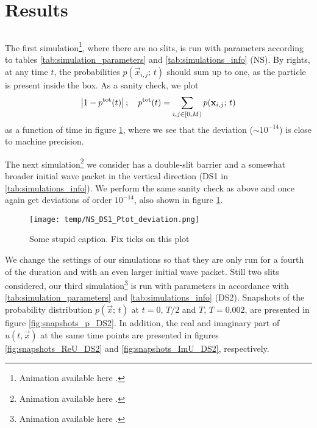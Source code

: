 \section{Results}\label{sec:results}




\subsection{}

    The first simulation\footnote{Animation available here .}, where there are no slits, is run with parameters according to tables \ref{tab:simulation_parameters} and \ref{tab:simulations_info} (NS). By rights, at any time $t$, the probabilities $p(\vec{x}_{i,j}; \, t)$ should sum up to one, as the particle is present inside the box. As a sanity check, we plot 
    \begin{equation}\label{eq:total_probability_deviation}
        \abs{1- p^\mathrm{tot}(t)}\,; \quad p^\mathrm{tot}(t) = \sum_{i,j\in [0, M)} p(\mathbf{x}_{i,j};\, t)
    \end{equation}
    as a function of time in figure \ref{fig:ptot_deviation_NS_DS1}, where we see that the deviation ($\sim 10^{-14}$) is close to machine precision.

    The next simulation\footnote{Animation available here .} we consider has a double-slit barrier and a somewhat broader initial wave packet in the vertical direction (DS1 in \ref{tab:simulations_info}). We perform the same sanity check as above and once again get deviations of order $ 10^{-14}$, also shown in figure \ref{fig:ptot_deviation_NS_DS1}.

    \begin{figure}[ht!]
        \centering
        \texttt{[image: temp/NS\_DS1\_Ptot\_deviation.png]}
        \caption{Some stupid caption. Fix ticks on this plot}
        \label{fig:ptot_deviation_NS_DS1}
    \end{figure}

    
    We change the settings of our simulations so that they are only run for a fourth of the duration and with an even larger initial wave packet. Still two slits considered, our third simulation\footnote{Animation available here .} is run with parameters in accordance with \ref{tab:simulation_parameters} and \ref{tab:simulations_info} (DS2). Snapshots of the probability distribution $p(\vec{x};\, t)$ at $t=0$, $T/2$ and $T$, $T=0.002$, are presented in figure \ref{fig:snapshots_p_DS2}.  In addition, the real and imaginary part of $u(t, \vec{x})$ at the same time points are presented in figures \ref{fig:snapshots_ReU_DS2} and \ref{fig:snapshots_ImU_DS2}, respectively.

